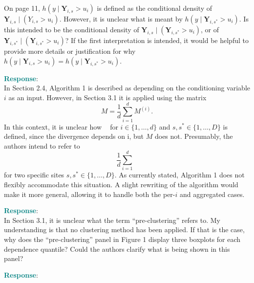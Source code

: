 \documentclass[a4paper,12pt]{article}
\newcommand{\eJSGa}[1]{\mathop{\mathrm{eJS}_{i, #1}^{\mathrm{G}_{\lambda}}}\nolimits}
\begin{document}
{\color{teal}
\noindent 
On page 11, $h(y \mid \boldsymbol{Y}_{i,s} > u_i)$ is defined as the conditional density of $\boldsymbol{Y}_{i,s} \mid (Y_{i,s} > u_i)$. 
However, it is unclear what is meant by $h(y \mid \boldsymbol{Y}_{i,s^*} > u_i)$. 
Is this intended to be the conditional density of $\boldsymbol{Y}_{i,s} \mid (\boldsymbol{Y}_{i,s^*} > u_i)$, or of $\boldsymbol{Y}_{i,s^*} \mid (\boldsymbol{Y}_{i,s^*} > u_i)$? 
If the first interpretation is intended, it would be helpful to provide more details or justification for why $h(y \mid \boldsymbol{Y}_{i,s} > u_i) = h(y \mid \boldsymbol{Y}_{i,s^*} > u_i)$.
}

\noindent \textcolor{teal}{\bf Response}: \\

{\color{teal}
\noindent 
  In Section 2.4, Algorithm 1 is described as depending on the conditioning variable $i$ as an input. 
However, in Section 3.1 it is applied using the matrix
\[
  M = \frac{1}{d}\sum_{i=1}^d M^{(i)}.
\]
In this context, it is unclear how $\eJSGa{i,s,s^*}$ for $i \in \{1, \ldots, d\}$ and $s, s^* \in \{1, \ldots, D\}$ is defined, since the divergence depends on i, but $M$ does not. 
Presumably, the authors intend to refer to
\[
  \frac{1}{d}\sum^d_{i=1}\eJSGa{i, s, s^*}
\]
for two specific sites $s, s^* \in \{1, \ldots, D\}$. 
As currently stated, Algorithm 1 does not flexibly accommodate this situation. 
A slight rewriting of the algorithm would make it more general, allowing it to handle both the per-$i$ and aggregated cases.
}

\noindent \textcolor{teal}{\bf Response}: \\


{\color{teal}
\noindent
In Section 3.1, it is unclear what the term ``pre-clustering'' refers to. 
My understanding is that no clustering method has been applied. 
If that is the case, why does the ``pre-clustering'' panel in Figure 1 display three boxplots for each dependence quantile? 
Could the authors clarify what is being shown in this panel?
}

\noindent \textcolor{teal}{\bf Response}: \\

\end{document}
